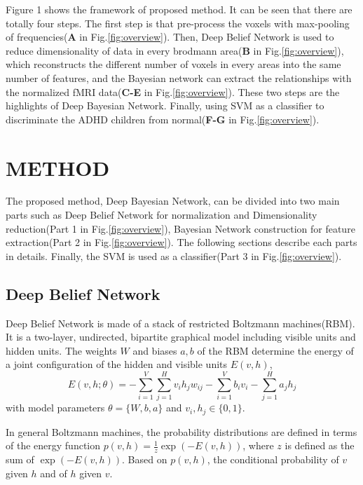 \documentclass{article}
\begin{document}
 
Figure 1 shows the framework of proposed method. It can be seen that there are totally four steps. The first step is that pre-process the
voxels with max-pooling of frequencies(\textbf{A} in Fig.\ref{fig:overview}). Then, Deep Belief Network is used to reduce dimensionality of data in every brodmann area(\textbf{B} in Fig.\ref{fig:overview}), which reconstructs the different number of voxels in every areas into the same number of features, and the Bayesian network can extract the relationships with the normalized fMRI data(\textbf{C-E} in Fig.\ref{fig:overview}). These two steps are the highlights of Deep Bayesian Network. Finally, using SVM as a classifier to discriminate the ADHD children from normal(\textbf{F-G} in Fig.\ref{fig:overview}).





\section{METHOD}
The proposed method, Deep Bayesian Network, can be divided into two main parts such as Deep Belief Network for  normalization and Dimensionality reduction(Part 1 in Fig.\ref{fig:overview}), Bayesian Network construction for feature extraction(Part 2 in Fig.\ref{fig:overview}). The following sections describe each parts in details. Finally, the SVM is used as a classifier(Part 3 in Fig.\ref{fig:overview}).

\subsection{Deep Belief Network}
Deep Belief Network is made of a stack of
restricted Boltzmann machines(RBM)\cite{13}. It is a two-layer, undirected, bipartite graphical model including visible units and hidden units. The weights $W$ and biases $a,b$ of the RBM determine the energy of
a joint configuration of the hidden and visible units $E(v,h)$,
\begin{equation}
E(v,h;\theta) = -\sum_{i=1}^V \sum_{j=1}^H v_ih_jw_{ij} - \sum_{i=1}^V b_iv_i - \sum_{j=1}^H a_jh_j
\end{equation}
with model parameters $\theta = \{W,b,a\}$ and $v_i,h_j \in \{0,1\}$. 

In general Boltzmann machines, the probability distributions are defined in terms of the energy function $p(v,h) = \frac{1}{z} \exp ( -E(v,h) )$,
where $z$ is defined as the sum of $\exp ( -E(v,h) )$.
Based on $p(v,h)$, the conditional probability of $v$ given $h$ and of $h$ given $v$.
\end{document}

